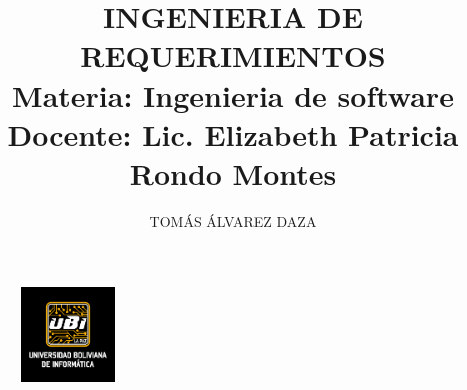 \documentclass[10pt,letterpaper]{report}
\author{TOMÁS ÁLVAREZ DAZA}
\begin{document}
\begin{titlepage}
	\begin{figure}
		\includegraphics[width=2.5cm]{image/logoUbi2}
	\end{figure}
	\title{INGENIERIA DE REQUERIMIENTOS\\
	\textbf{Materia:} Ingenieria de software\\ 
	\textbf{Docente:}  Lic. Elizabeth Patricia Rondo Montes
 }
	
\end{titlepage}
\maketitle



\tableofcontents

\appendix



\end{document}
